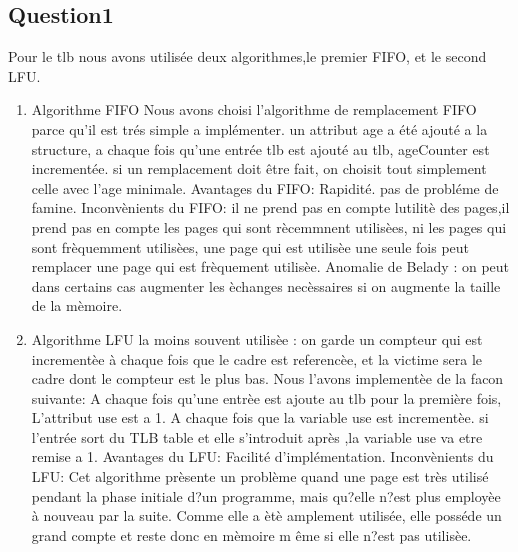 \documentclass{article}
\begin{document}
\subsection{Question1}
Pour le tlb nous avons utilis\'{e}e deux algorithmes,le premier FIFO, et le second LFU. 
\newline
\begin{enumerate}
\item Algorithme FIFO
\newline Nous avons choisi l'algorithme de remplacement FIFO parce qu'il est tr\'{e}s simple a impl\'{e}menter.
un attribut age a \'{e}t\'{e} ajout\'{e} a la structure, a chaque fois qu'une entr\'{e}e tlb est ajout\'{e} au tlb, ageCounter est increment\'{e}e. si un remplacement doit \^{e}tre fait, on choisit tout simplement celle avec l'age minimale. 
\newline
\newline Avantages du FIFO:
Rapidit\'{e}.
pas de  probl\'{e}me de famine.
\newline
\newline Inconv\`{e}nients  du FIFO:
\newline
il ne prend pas en compte lutilit\`{e} des pages,il prend pas en compte les pages qui sont r\`{e}cemmnent utilis\`{e}es, ni les pages qui sont fr\`{e}quemment utilis\`{e}es, une page qui est utilis\`{e}e une seule fois peut remplacer une page qui est fr\`{e}quement utilis\`{e}e.
\newline Anomalie de Belady : on peut dans certains cas augmenter les  \`{e}changes nec\`{e}ssaires si on augmente la taille de la m\`{e}moire.
\newline 
\item Algorithme LFU
\newline
la moins souvent utilis\`{e}e : on garde un compteur qui est increment\`{e}e  \`{a} chaque fois que le cadre est referenc\`{e}e, et la victime sera le cadre dont le compteur est le plus bas.
Nous l'avons implement\`{e}e de la facon suivante: A chaque fois qu'une entr\`{e}e est ajoute au tlb pour la premi\`{e}re fois, L'attribut use est a 1. A chaque fois que  la variable use est increment\`{e}e. si l'entr\'{e}e sort du TLB table  et elle s'introduit apr\`{e}s ,la variable  use va etre remise a 1.
\newline
Avantages du LFU:
\newline
Facilit\'{e} d'impl\'{e}mentation.
\newline
Inconv\`{e}nients du LFU:
\newline
Cet algorithme pr\`{e}sente un probl\`{e}me quand une page est tr\`{e}s utilis\'{e} pendant la phase initiale d?un programme, mais qu?elle n?est plus employ\`{e}e \`{a} nouveau par la suite. Comme elle a \`{e}t\`{e} amplement utilis\'{e}e, elle poss\'{e}de un grand compte et reste donc en m\`{e}moire m \^{e}me si elle n?est pas utilis\`{e}e.
\end{enumerate}
\end{document}
